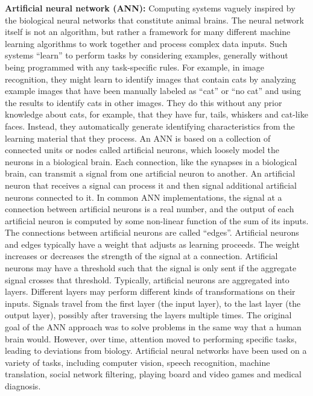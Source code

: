 \documentclass[a4paper,10pt]{article}
\begin{document}
{\noindent}\textbf{Artificial neural network (ANN):} Computing systems vaguely inspired by the biological neural networks that constitute animal brains. The neural network itself is not an algorithm, but rather a framework for many different machine learning algorithms to work together and process complex data inputs. Such systems ``learn'' to perform tasks by considering examples, generally without being programmed with any task-specific rules. For example, in image recognition, they might learn to identify images that contain cats by analyzing example images that have been manually labeled as ``cat'' or ``no cat'' and using the results to identify cats in other images. They do this without any prior knowledge about cats, for example, that they have fur, tails, whiskers and cat-like faces. Instead, they automatically generate identifying characteristics from the learning material that they process. An ANN is based on a collection of connected units or nodes called artificial neurons, which loosely model the neurons in a biological brain. Each connection, like the synapses in a biological brain, can transmit a signal from one artificial neuron to another. An artificial neuron that receives a signal can process it and then signal additional artificial neurons connected to it. In common ANN implementations, the signal at a connection between artificial neurons is a real number, and the output of each artificial neuron is computed by some non-linear function of the sum of its inputs. The connections between artificial neurons are called ``edges''. Artificial neurons and edges typically have a weight that adjusts as learning proceeds. The weight increases or decreases the strength of the signal at a connection. Artificial neurons may have a threshold such that the signal is only sent if the aggregate signal crosses that threshold. Typically, artificial neurons are aggregated into layers. Different layers may perform different kinds of transformations on their inputs. Signals travel from the first layer (the input layer), to the last layer (the output layer), possibly after traversing the layers multiple times. The original goal of the ANN approach was to solve problems in the same way that a human brain would. However, over time, attention moved to performing specific tasks, leading to deviations from biology. Artificial neural networks have been used on a variety of tasks, including computer vision, speech recognition, machine translation, social network filtering, playing board and video games and medical diagnosis.
\end{document}

